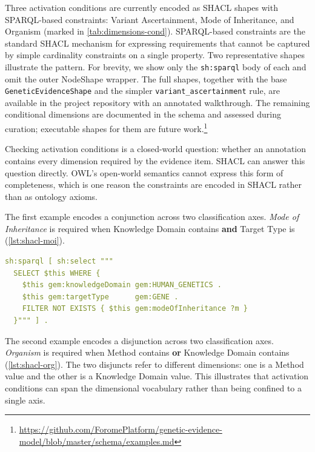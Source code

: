 Three activation conditions are currently encoded as SHACL shapes with
SPARQL-based constraints: Variant Ascertainment, Mode of Inheritance, and
Organism (marked in \cref{tab:dimensions-cond}). SPARQL-based constraints
are the standard SHACL mechanism for expressing requirements that cannot be
captured by simple cardinality constraints on a single property. Two
representative shapes illustrate the pattern. For brevity, we show only the
\texttt{sh:sparql} body of each and omit the outer NodeShape wrapper. The
full shapes, together with the base \texttt{GeneticEvidenceShape} and the
simpler \texttt{variant\_ascertainment} rule, are available in the project
repository with an annotated walkthrough. The remaining conditional
dimensions are documented in the schema and
assessed during curation;
executable shapes for them are future work.\footnote{\url{https://github.com/ForomePlatform/genetic-evidence-model/blob/master/schema/examples.md}}

Checking activation conditions is a closed-world question: whether an
annotation contains every dimension required by the evidence item. SHACL can
answer this question directly. OWL's open-world semantics cannot express
this form of completeness, which is one reason the constraints are encoded
in SHACL rather than as ontology axioms.

The first example encodes a conjunction across two classification axes.
\emph{Mode of Inheritance} is required when Knowledge Domain contains
 \textbf{and} Target Type is 
(\cref{lst:shacl-moi}).

\begin{lstlisting}[language=yaml, caption={Compact form of the conditional-activation shape for \emph{Mode of Inheritance}. The outer NodeShape wrapper is omitted. The two triple patterns in \texttt{WHERE} form the conjunction; \texttt{FILTER NOT EXISTS} identifies instances that satisfy the condition but lack the required dimension.}, label={lst:shacl-moi}]
sh:sparql [ sh:select """
  SELECT $this WHERE {
    $this gem:knowledgeDomain gem:HUMAN_GENETICS .
    $this gem:targetType      gem:GENE .
    FILTER NOT EXISTS { $this gem:modeOfInheritance ?m }
  }""" ] .
\end{lstlisting}

The second example encodes a disjunction across two classification axes.
\emph{Organism} is required when Method contains 
\textbf{or} Knowledge Domain contains 
(\cref{lst:shacl-org}). The two disjuncts refer to different dimensions:
one is a Method value and the other is a Knowledge Domain value. This
illustrates that activation conditions can span the dimensional vocabulary
rather than being confined to a single axis.

